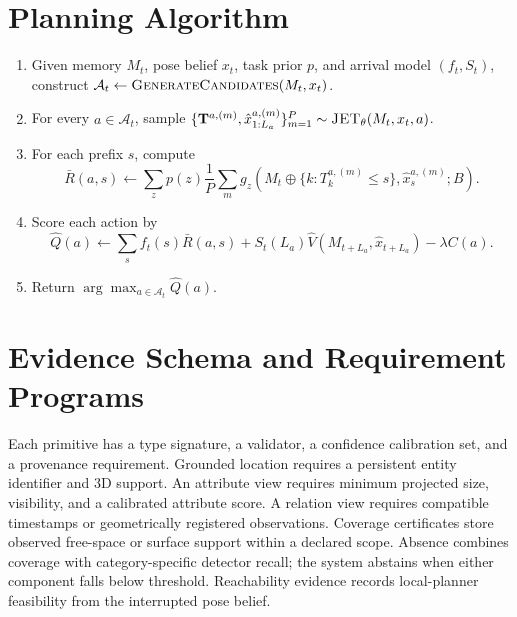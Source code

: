 \section{Planning Algorithm}
\label{app:algorithm}

\begin{enumerate}[leftmargin=*,label=\textbf{\arabic*.}]
  \item Given memory $M_t$, pose belief $x_t$, task prior $p$, and arrival model
  $(f_t,S_t)$, construct
  $\mathcal{A}_t\gets\textsc{GenerateCandidates}(M_t,x_t)$.
  \item For every $a\in\mathcal{A}_t$, sample
  $\{\mathbf{T}^{a,(m)},\hat x^{a,(m)}_{1:L_a}\}_{m=1}^{P}
  \sim\textsc{JET}_\theta(M_t,x_t,a)$.
  \item For each prefix $s$, compute
  \[
  \bar R(a,s)\gets \sum_z p(z)\frac{1}{P}\sum_m
  g_z(M_t\oplus\{k:T_k^{a,(m)}\le s\},\hat x_s^{a,(m)};B).
  \]
  \item Score each action by
  \[
  \hat Q(a)\gets
  \sum_s f_t(s)\bar R(a,s)+S_t(L_a)\hat V(M_{t+L_a},\hat x_{t+L_a})
  -\lambda C(a).
  \]
  \item Return $\arg\max_{a\in\mathcal{A}_t}\hat Q(a)$.
\end{enumerate}

\section{Evidence Schema and Requirement Programs}
\label{app:programs}

Each primitive has a type signature, a validator, a confidence calibration set, and a provenance requirement.
Grounded location requires a persistent entity identifier and 3D support.
An attribute view requires minimum projected size, visibility, and a calibrated attribute score.
A relation view requires compatible timestamps or geometrically registered observations.
Coverage certificates store observed free-space or surface support within a declared scope.
Absence combines coverage with category-specific detector recall; the system abstains when either component falls below threshold.
Reachability evidence records local-planner feasibility from the interrupted pose belief.

\begin{table}[h]
  \centering
  \caption{\textbf{Task program specification.}
  This table will be populated from the benchmark manifest so that the paper and released evaluator use identical definitions.}
  \label{tab:programs}
\end{table}

